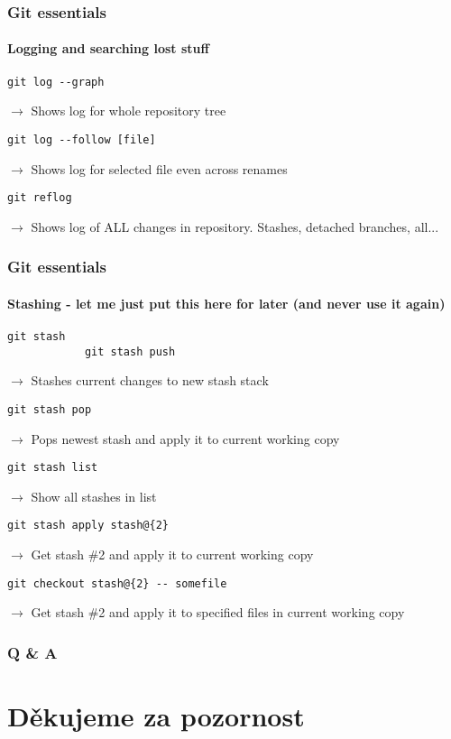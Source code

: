 \documentclass{beamer}
\begin{document}
    \begin{frame}[fragile]
        \frametitle{Git essentials}
        \framesubtitle{Logging and searching lost stuff}
        \begin{lstlisting}[gobble=12]
            git log --graph
        \end{lstlisting}
        $\rightarrow$ Shows log for whole repository tree
        \begin{lstlisting}[gobble=12]
            git log --follow [file]
        \end{lstlisting}
        $\rightarrow$ Shows log for selected file even across renames
        \begin{lstlisting}[gobble=12]
            git reflog
        \end{lstlisting}
        $\rightarrow$ Shows log of ALL changes in repository. Stashes, detached branches, all...
    \end{frame}
    \begin{frame}[fragile]
        \frametitle{Git essentials}
        \framesubtitle{Stashing - let me just put this here for later (and never use it again)}
        \begin{lstlisting}[gobble=12]
            git stash
            git stash push
        \end{lstlisting}
        $\rightarrow$ Stashes current changes to new stash stack
        \begin{lstlisting}[gobble=12]
            git stash pop
        \end{lstlisting}
        $\rightarrow$ Pops newest stash and apply it to current working copy
        \begin{lstlisting}[gobble=12]
            git stash list
        \end{lstlisting}
        $\rightarrow$ Show all stashes in list
        \begin{lstlisting}[gobble=12]
            git stash apply stash@{2}
        \end{lstlisting}
        $\rightarrow$ Get stash \#2 and apply it to current working copy
        \begin{lstlisting}[gobble=12]
            git checkout stash@{2} -- somefile
        \end{lstlisting}
        $\rightarrow$ Get stash \#2 and apply it to specified files in current working copy
    \end{frame}
    \begin{frame}
        \frametitle{Q \& A}
    \end{frame}
    \section{Děkujeme za pozornost}
\end{document}
